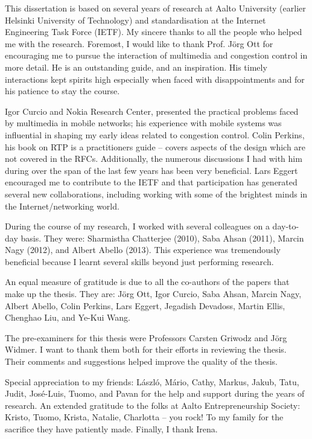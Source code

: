 \documentclass[dissertation,final]{aaltoseries} %
\begin{document}

\begin{preface}[Espoo]

This dissertation is based on several years of research at Aalto University
(earlier Helsinki University of Technology) and standardisation at the
Internet Engineering Task Force (IETF). My sincere thanks to all the people who
helped me with the research. Foremost, I would like to thank Prof. J\"{o}rg Ott
for encouraging me to pursue the interaction of multimedia and congestion
control in more detail. He is an outstanding guide, and an inspiration. His
timely interactions kept spirits high especially when faced with
disappointments and for his patience to stay the course.

Igor Curcio and Nokia Research Center, presented the practical problems faced
by multimedia in mobile networks; his experience with mobile systems was
influential in shaping my early ideas related to congestion control.
%
Colin Perkins, his book on RTP is a practitioners guide -- covers aspects of the
design which are not covered in the RFCs. Additionally, the numerous
discussions I had with him during over the span of the last few years has been
very beneficial.
%
Lars Eggert encouraged me to contribute to the IETF and that participation
has generated several new collaborations, including working with some of the
brightest minds in the Internet/networking world.

During the course of my research, I worked with several colleagues on a
day-to-day basis. They were: Sharmistha Chatterjee (2010), Saba Ahsan (2011),
Marcin Nagy (2012), and Albert Abello (2013). This experience was tremendously
beneficial because I learnt several skills beyond just performing research.

An equal measure of gratitude is due to all the co-authors of  the papers that
make up the thesis. They are: J\"{o}rg Ott, Igor Curcio, Saba Ahsan, Marcin
Nagy, Albert Abello, Colin Perkins, Lars Eggert, Jegadish Devadoss,  Martin
Ellis, Chenghao Liu, and Ye-Kui Wang.

The pre-examiners for this thesis were Professors Carsten Griwodz and J\"{o}rg
Widmer. I want to thank them both for their efforts in reviewing the thesis.
Their comments and suggestions helped improve the quality of the thesis.

Special appreciation to my friends: L\'{a}szl\'{o}, M\'{a}rio, Cathy, Markus,
Jakub, Tatu, Judit, Jos\'{e}-Luis, Tuomo, and Pavan for the help and support
during the years of research. An extended gratitude to the folks at Aalto
Entrepreneurship Society: Kristo, Tuomo, Krista, Natalie, Charlotta -- you
rock!  To my family for the sacrifice they have patiently made. Finally, I
thank Irena.

\end{preface}
\end{document}
